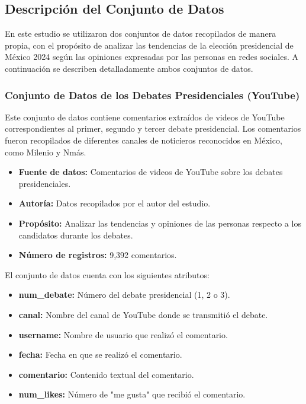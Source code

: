 \documentclass[10pt, a4paper]{article}
\begin{document}
	\subsection{Descripción del Conjunto de Datos}
	
	En este estudio se utilizaron dos conjuntos de datos recopilados de manera propia, con el propósito de analizar las tendencias de la elección presidencial de México 2024 según las opiniones expresadas por las personas en redes sociales. A continuación se describen detalladamente ambos conjuntos de datos.
	
	\subsubsection{Conjunto de Datos de los Debates Presidenciales (YouTube)}
	
	Este conjunto de datos contiene comentarios extraídos de videos de YouTube correspondientes al primer, segundo y tercer debate presidencial. Los comentarios fueron recopilados de diferentes canales de noticieros reconocidos en México, como Milenio y Nmás.
	
	\begin{itemize}
		\item \textbf{Fuente de datos:} Comentarios de videos de YouTube sobre los debates presidenciales.
		\item \textbf{Autoría:} Datos recopilados por el autor del estudio.
		\item \textbf{Propósito:} Analizar las tendencias y opiniones de las personas respecto a los candidatos durante los debates.
		\item \textbf{Número de registros:} 9,392 comentarios.
	\end{itemize}
	
	El conjunto de datos cuenta con los siguientes atributos:
	
	\begin{itemize}
		\item \textbf{num\_debate:} Número del debate presidencial (1, 2 o 3).
		\item \textbf{canal:} Nombre del canal de YouTube donde se transmitió el debate.
		\item \textbf{username:} Nombre de usuario que realizó el comentario.
		\item \textbf{fecha:} Fecha en que se realizó el comentario.
		\item \textbf{comentario:} Contenido textual del comentario.
		\item \textbf{num\_likes:} Número de "me gusta" que recibió el comentario.
	\end{itemize}
	
\end{document}
